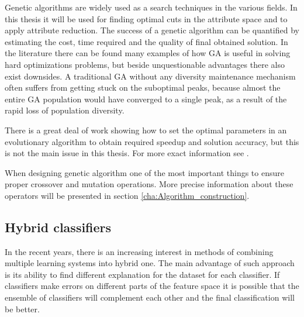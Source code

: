 Genetic algorithms are widely used as a search techniques in the various fields. 
In this thesis it will be used for finding optimal cuts in the attribute space and to 
apply attribute reduction. The success of a genetic algorithm can be quantified by estimating 
the cost, time required and the quality of final obtained solution. 
In the literature there can be found many examples of how GA is useful in solving hard 
optimizations problems, but beside unquestionable advantages there also exist downsides. 
A traditional GA without any diversity maintenance mechanism often suffers from getting 
stuck on the suboptimal peaks, because almost the entire GA population would have converged 
to a single peak, as a result of the rapid loss of population diversity. 

There is a great deal of work showing how to set the optimal parameters in an evolutionary 
algorithm to obtain required speedup and solution accuracy, but this is not the main issue 
in this thesis. For more exact information see .

When designing genetic algorithm one of the most important things to ensure proper crossover 
and mutation operations. More precise information about these operators will be
presented in section \ref{cha:Algorithm_construction}.

\subsection{Hybrid classifiers}
\label{cha:Hybrid_classifiers}
In the recent years, there is an increasing interest in methods of combining
multiple learning systems into hybrid one. The main advantage of such approach
is its ability to find different explanation for the dataset for each
classifier. If classifiers make errors on different parts of the feature space
it is possible that the ensemble of classifiers will complement each other and
the final classification will be better. 

